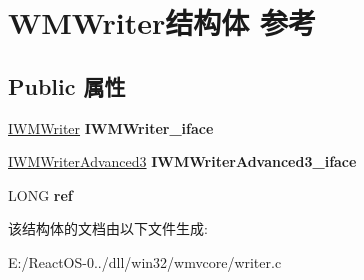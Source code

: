 \hypertarget{struct_w_m_writer}{}\section{W\+M\+Writer结构体 参考}
\label{struct_w_m_writer}
\subsection*{Public 属性}
\begin{DoxyCompactItemize}
\item 
\mbox{\label{struct_w_m_writer_a08bfd446c2f6748685ad9eab761302e0}} 
\hyperlink{interface_i_w_m_writer}{I\+W\+M\+Writer} {\bfseries I\+W\+M\+Writer\+\_\+iface}
\item 
\mbox{\label{struct_w_m_writer_ac0e329be998b2984eacd4a5bc392056d}} 
\hyperlink{interface_i_w_m_writer_advanced3}{I\+W\+M\+Writer\+Advanced3} {\bfseries I\+W\+M\+Writer\+Advanced3\+\_\+iface}
\item 
\mbox{\label{struct_w_m_writer_acfd5cef142c79612c0191f7926d70efb}} 
L\+O\+NG {\bfseries ref}
\end{DoxyCompactItemize}


该结构体的文档由以下文件生成\+:\begin{DoxyCompactItemize}
\item 
E\+:/\+React\+O\+S-\/0../dll/win32/wmvcore/writer.\+c\end{DoxyCompactItemize}
